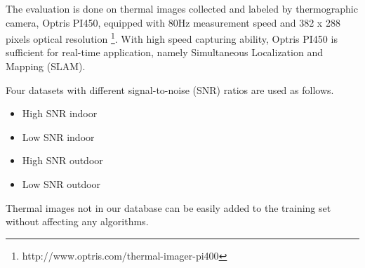 The evaluation is done on thermal images
collected and labeled by thermographic camera, Optris PI450, equipped with 80Hz
measurement speed and 382 x 288 pixels optical resolution \footnote{http://www.optris.com/thermal-imager-pi400}. With high speed capturing ability, Optris PI450 is sufficient for real-time application, namely Simultaneous Localization and Mapping (SLAM).   

Four datasets with different signal-to-noise (SNR) ratios  are used as follows. 
\begin{itemize}
\item High SNR indoor
\item Low SNR indoor 
\item High SNR outdoor
\item Low SNR outdoor 
\end{itemize}

Thermal images not in our database can be easily added to the training set without affecting any algorithms.












